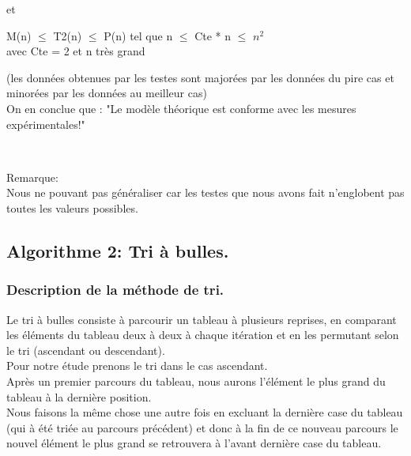 \documentclass[12pt]{article}
\begin{document}
 et \\
 
\begin{center}

\color{blue} 
 M(n) $\le$ T2(n) $\le$ P(n) tel que n  $\le$ Cte * n $\le$ $n^2$ \\
\color{black}
 avec Cte = 2 et n très grand\\

\end{center}

 (les données obtenues par les testes sont majorées par les données du pire cas et minorées par les données au meilleur cas)\\
  
  On en conclue que :
\color{red}
 "Le modèle théorique est conforme avec les mesures expérimentales!"\\
\color{black}

\texttt{  }

\color{red}
Remarque:\\
\color{black}
Nous ne pouvant pas généraliser car les testes que nous avons fait n'englobent pas toutes les valeurs possibles.




\newpage




\subsection{Algorithme 2: Tri à bulles.}
\subsubsection{Description de la méthode de tri.}
Le tri à bulles consiste à parcourir un tableau à plusieurs reprises,
 en comparant les éléments du tableau deux à deux à chaque itération et en les permutant selon le tri (ascendant ou descendant).\\
 
Pour notre étude prenons le tri dans le cas ascendant.\\

Après un premier parcours du tableau, nous aurons l'élément le plus grand du tableau à la dernière position.\\

 Nous faisons la même chose une autre fois en excluant la dernière case du tableau  (qui à été triée au parcours précédent)
 et donc à la fin de ce nouveau parcours le nouvel élément le plus grand se retrouvera à l'avant dernière case du tableau.\\
  
\end{document}
